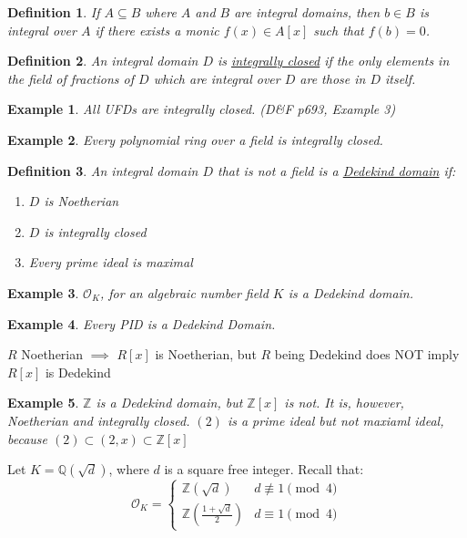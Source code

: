 \documentclass{article}
\newcommand{\air}{\mathcal{O}_K}
\newcommand{\Q}{\mathbb{Q}}
\newcommand{\Z}{\mathbb{Z}}
\newtheorem{example}{Example}[subsection]
\newtheorem{definition}{Definition}[subsection]
\begin{document}
      \newpage
      \begin{definition}
      If $A\subseteq B$ where $A$ and $B$ are integral domains, then $b\in B$ is integral over $A$ if there exists a monic $f(x)\in A[x]$ such that $f(b)=0$. 
      \end{definition}
      \begin{definition}
      An integral domain $D$ is \underline{integrally closed} if the only elements in the field of fractions of $D$ which are integral over $D$ are those in $D$ itself. 
      \end{definition}
      \begin{example}
      All UFDs are integrally closed. (D\&F p693, Example 3)
      \end{example}
      \begin{example}
      Every polynomial ring over a field is integrally closed.
      \end{example}
      \begin{definition}
      An integral domain $D$ that is not a field is a \underline{Dedekind domain} if:
      \begin{enumerate}
          \item $D$ is Noetherian
          \item $D$ is integrally closed
          \item Every prime ideal is maximal
      \end{enumerate}
      \end{definition}
      \begin{example}
      $\air$, for an algebraic number field $K$ is a Dedekind domain. 
      \end{example}
      \begin{example}
      Every PID is a Dedekind Domain.
      \end{example}
      $R$ Noetherian $\implies$ $R[x]$ is Noetherian, but $R$ being Dedekind does NOT imply $R[x]$ is Dedekind
      \begin{example}
      $\Z$ is a Dedekind domain, but $\Z[x]$ is not. It is, however, Noetherian and integrally closed. $(2)$ is a prime ideal but not maxiaml ideal, because $(2)\subset (2,x)\subset \Z[x]$
      \end{example}
      Let $K=\Q(\sqrt{d})$, where $d$ is a square free integer. Recall that:
      \begin{equation*}
          \air = \begin{cases}
          \Z(\sqrt{d}) &d\not\equiv 1\pmod{4}\\
          \Z\left(\frac{1+\sqrt{d}}{2}\right) &d\equiv 1\pmod{4}
          \end{cases}
      \end{equation*}
\end{document}
